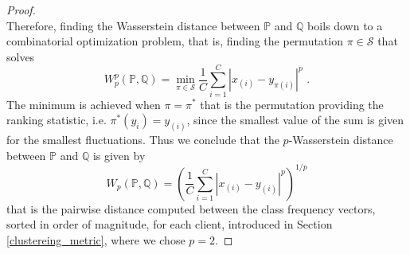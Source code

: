 \begin{proof}
\begin{equation}
\end{equation}
Therefore, finding the Wasserstein distance between $\mathbb{P}$ and $\mathbb{Q}$ boils down to a combinatorial optimization problem, that is, finding the permutation $\pi \in \mathcal{S}$ that solves
\begin{equation}\label{eq:min_pi_empirical}
W_p^p(\mathbb{P}, \mathbb{Q}) = \min_{\pi \in \mathcal{S}} \dfrac{1}{C}\sum_{i = 1}^C |x_{(i)}- y_{\pi(i)}|^p\,\,.
\end{equation}
The minimum is achieved when $\pi = \pi^*$ that is the permutation providing the ranking statistic, i.e. $\pi^*(y_i) = y_{(i)}$, since the smallest value of the sum is given for the smallest fluctuations. Thus we conclude that the $p$-Wasserstein distance between $\mathbb{P}$ and $\mathbb{Q}$ is given by
\begin{equation}\label{eq:wass_empirical}
    W_p(\mathbb{P}, \mathbb{Q}) = \left (\dfrac{1}{C} \sum_{i = 1}^C|x_{(i)}- y_{(i)}|^p\right )^{1/p}
\end{equation}
that is the pairwise distance computed between the class frequency vectors, sorted in order of magnitude, for each client, introduced in Section \ref{clustereing_metric}, where we chose $p = 2$.
\end{proof}
